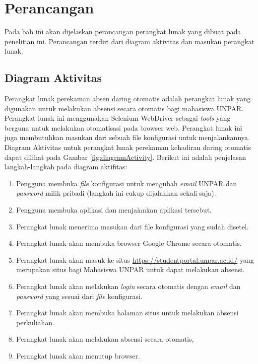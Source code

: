\chapter{Perancangan}
\label{chap:perancangan}
Pada bab ini akan dijelaskan perancangan perangkat lunak yang dibuat pada penelitian ini. Perancangan terdiri dari diagram aktivitas dan masukan perangkat lunak. 

\section{Diagram Aktivitas}
\label{sec:diagramAktivitas}
Perangkat lunak perekaman absen daring otomatis adalah perangkat lunak yang digunakan untuk melakukan absensi secara otomatis bagi mahasiswa UNPAR. Perangkat lunak ini menggunakan Selenium WebDriver sebagai \textit{tools} yang berguna untuk melakukan otomatisasi pada browser web. Perangkat lunak ini juga membutuhkan masukan dari sebuah file konfigurasi untuk menjalankannya.
Diagram Aktivitas untuk perangkat lunak perekaman kehadiran daring otomatis dapat dilihat pada Gambar \ref{fig:diagramActivity}. Berikut ini adalah penjelasan langkah-langkah pada diagram aktifitas:
\begin{enumerate}
	\item Pengguna membuka \textit{file} konfigurasi untuk mengubah \textit{email} UNPAR dan \textit{password} milik pribadi (langkah ini cukup dijalankan sekali saja).
	\item Pengguna membuka aplikasi dan menjalankan aplikasi tersebut.
	\item Perangkat lunak menerima masukan dari file konfigurasi yang sudah disetel.
	\item Perangkat lunak akan membuka browser Google Chrome secara otomatis.
	\item Perangkat lunak akan masuk ke situs \url{https://studentportal.unpar.ac.id/} yang merupakan situs bagi Mahasiswa UNPAR untuk dapat melakukan absensi.
	\item Perangkat lunak akan melakukan \textit{login} secara otomatis dengan \textit{email} dan \textit{password} yang sesuai dari \textit{file} konfigurasi.
	\item Perangkat lunak akan membuka halaman situs untuk melakukan absensi perkuliahan.
	\item Perangkat lunak akan melakukan absensi secara otomatis,
	\item Perangkat lunak akan menutup browser.
\end{enumerate}

